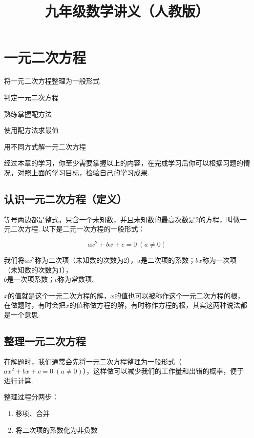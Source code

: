 \documentclass[lang=cn, 10pt, titlestyle=hang]{elegantbook}
\title{九年级数学讲义（人教版）}
\begin{document}
\tableofcontents

\chapter{一元二次方程}



\begin{introduction}[本章学习目标]

\item 将一元二次方程整理为一般形式
\item 判定一元二次方程
\item 熟练掌握配方法
\item 使用配方法求最值
\item 用不同方式解一元二次方程

\end{introduction}

经过本章的学习，你至少需要掌握以上的内容，在完成学习后你可以根据习题的情况，对照上面的学习目标，检验自己的学习成果.

\section{认识一元二次方程（定义）}
等号两边都是整式，只含一个未知数，并且未知数的最高次数是2的方程，叫做一元二次方程. 以下是二元一次方程的一般形式：

$$
ax^2 + bx + c = 0 \ (a \neq 0)
$$



我们将$ax^2$称为二次项（未知数的次数为2），a是二次项的系数；$bx$称为一次项（未知数的次数为1），\\ $b$是一次项系数；$c$称为常数项.



$x$的值就是这个一元二次方程的解，$x$的值也可以被称作这个一元二次方程的根，在做题时，有时会把$x$的值称做方程的解，有时称作方程的根，其实这两种说法都是一个意思.

\section{整理一元二次方程}

在解题时，我们通常会先将一元二次方程整理为一般形式（$
ax^2 + bx + c = 0 \ (a \neq 0)
$），这样做可以减少我们的工作量和出错的概率，便于进行计算.



整理过程分两步：
\begin{enumerate}
    \item 移项、合并
    \item 将二次项的系数化为非负数
\end{enumerate}
\end{document}
